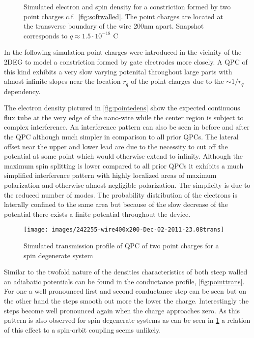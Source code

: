 \begin{figure}[h]
\caption{Simulated electron and spin density for a constriction formed by two point charges c.f.~\cref{fig:softwalled}. The point charges are located at the transverse boundary of the wire 200nm apart. Snapshot corresponds to $q\approx 1.5\cdot 10^{-18}$ C}
\end{figure}
In the following simulation point charges were introduced in the vicinity of the 2DEG to model a constriction formed by gate electrodes more closely. A QPC of this kind exhibits a very slow varying potenital throughout large parts with almost infinite slopes near the location $r_q$ of the point charges due to the $\sim 1/r_q$ dependency.\par
The electron density pictured in \cref{fig:pointedens} show the expected continuous flux tube at the very edge of the nano-wire while the center region is subject to complex interference. An interference pattern can also be seen in before and after the QPC although much simpler in comparison to all prior QPCs. The lateral offset near the upper and lower lead are due to the necessity to cut off the potential at some point which would otherwise extend to infinity.
Although the maximum spin splitting is lower compared to all prior QPCs it exhibits a much simplified interference pattern with highly localized areas of maximum polarization and otherwise almost negligible polarization. The simplicity is due to the reduced number of modes. The probability distribution of the electrons is laterally confined to the same area but because of the slow decrease of the potential there exists a finite potential throughout the device.\par
\begin{figure}[h]
\centering
\texttt{[image: images/242255-wire400x200-Dec-02-2011-23.08trans]}
\caption{Simulated transmission profile of QPC of two point charges for a spin degenerate system}\label{fig:qpcpointnospin}
\end{figure}
Similar to the twofold nature of the densities characteristics of both steep walled an adiabatic potentials can be found in the conductance profile, \cref{fig:pointtrans}. For one a well pronounced first and second conductance step can be seen but on the other hand the steps smooth out more the lower the charge. Interestingly the steps become well pronounced again when the charge approaches zero. As this pattern is also observed for spin degenerate systems as can be seen in \cref{fig:qpcpointnospin} a relation of this effect to a spin-orbit coupling seems unlikely. 
